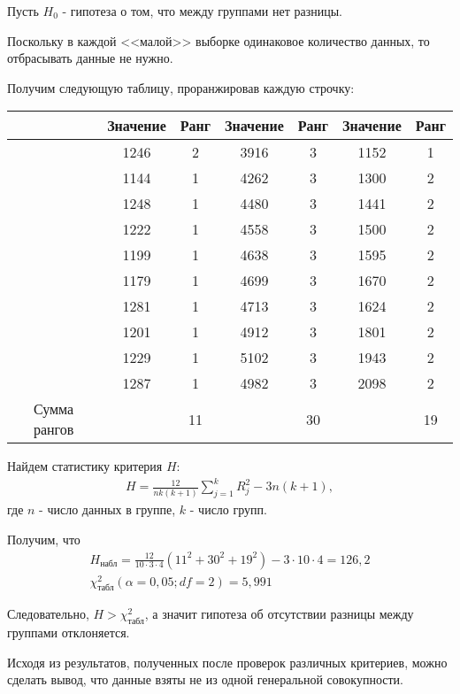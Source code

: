 \documentclass[utf8, a4paper, 14pt, russian, oneside]{book}
\begin{document}
\newpage
{}

Пусть $H_0$ - гипотеза о том, что между группами нет разницы.

Поскольку в каждой <<малой>> выборке одинаковое количество данных, то отбрасывать данные не нужно.

Получим следующую таблицу, проранжировав каждую строчку:
\begin{table}[h!]
    \centering 
    \begin{tabular}{|c|c|c|c|c|c|c|}
        \hline
        & Значение & Ранг & Значение & Ранг & Значение & Ранг \\ \hline
        & 1246 & 2 & 3916 & 3 & 1152 & 1 \\ \hline 
        & 1144 & 1 & 4262 & 3 & 1300 & 2 \\ \hline 
        & 1248 & 1 & 4480 & 3 & 1441 & 2 \\ \hline 
        & 1222 & 1 & 4558 & 3 & 1500 & 2 \\ \hline 
        & 1199 & 1 & 4638 & 3 & 1595 & 2 \\ \hline 
        & 1179 & 1 & 4699 & 3 & 1670 & 2 \\ \hline 
        & 1281 & 1 & 4713 & 3 & 1624 & 2 \\ \hline 
        & 1201 & 1 & 4912 & 3 & 1801 & 2 \\ \hline 
        & 1229 & 1 & 5102 & 3 & 1943 & 2 \\ \hline 
        & 1287 & 1 & 4982 & 3 & 2098 & 2 \\ \hline 
        Сумма рангов & & 11 & & 30 & & 19 \\ \hline
    \end{tabular}
\end{table}

Найдем статистику критерия $H$:
\begin{align*}
    H = \frac{12}{nk(k+1)} \sum_{j=1}^k R^2_j - 3n(k+1),
\end{align*}
где $n$ - число данных в группе, $k$ - число групп.

Получим, что
\begin{gather*}
    H_{\text{набл}}  = \frac{12}{10 \cdot 3 \cdot 4}\left(11^2 + 30^2 + 19^2\right) - 3 \cdot 10 \cdot 4 = 126,2 \\
    \chi^2_{\text{табл}}(\alpha = 0,05; df = 2) = 5,991
\end{gather*}

Следовательно, $H > \chi^2_{\text{табл}}$, а значит гипотеза об отсутствии разницы между группами отклоняется.
\newpage

Исходя из результатов, полученных после проверок различных критериев, можно сделать вывод, что данные взяты не из одной генеральной совокупности.
\end{document}

